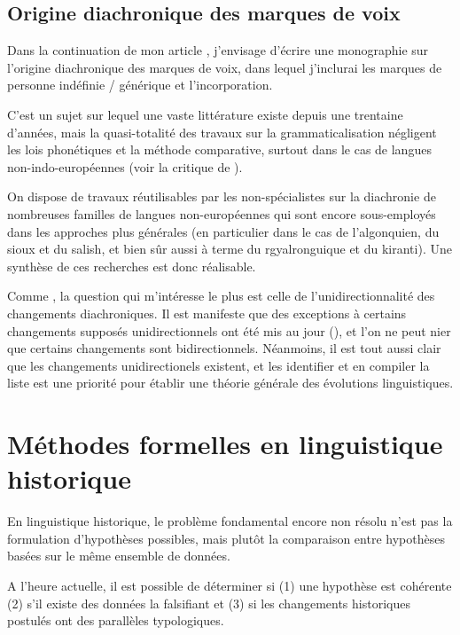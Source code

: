 \documentclass[oldfontcommands,oneside,a4paper,11pt]{article}
\begin{document}
 
 \subsection{Origine diachronique des marques de voix} 
Dans  la continuation de mon article \citet{jacques14antipassive}, j'envisage d'écrire une monographie sur l'origine diachronique des marques de voix, dans lequel j'inclurai les marques de personne indéfinie / générique et l'incorporation.

C'est un sujet sur lequel une vaste littérature  existe depuis une trentaine d'années, mais la quasi-totalité des travaux sur la grammaticalisation négligent les lois phonétiques et la méthode comparative, surtout dans le cas de langues non-indo-européennes (voir la critique de \citealt{heath98hermit}).

On dispose de travaux réutilisables par les non-spécialistes sur la diachronie de nombreuses familles de langues non-européennes qui sont encore sous-employés dans les approches plus générales (en particulier dans le cas de l'algonquien, du sioux et du salish, et bien sûr aussi à terme du rgyalronguique et du kiranti). Une synthèse de ces recherches est donc réalisable.

 Comme \citet{haspelmath90passive}, la question qui m'intéresse le plus est celle de l'unidirectionnalité des changements diachroniques. Il est manifeste que des exceptions à certains changements supposés unidirectionnels ont été mis au jour (\citealt{norde09degrammaticalization}), et  l'on ne peut nier que certains changements sont bidirectionnels. Néanmoins, il est tout aussi clair que les changements unidirectionels existent, et les identifier et en compiler la liste est une priorité pour établir une théorie générale des évolutions linguistiques.  
 

  
\section{Méthodes formelles en linguistique historique}

En linguistique historique, le problème fondamental encore non résolu n'est pas la formulation d'hypothèses possibles, mais plutôt la comparaison entre hypothèses basées sur le même ensemble de données. 

A l'heure actuelle, il est possible de déterminer si (1) une hypothèse est cohérente (2) s'il existe des données la falsifiant et (3) si les changements historiques postulés ont des parallèles typologiques. 
\end{document}
